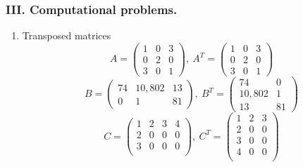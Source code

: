 \documentclass{article}
\begin{document}
\begin{enumerate}
\begin{enumerate}
    \end{enumerate}
\end{enumerate}

\subsubsection*{ III. \textbf{Computational problems.}}
\begin{enumerate}
    \item Transposed matrices
    \begin{displaymath}
        A = \begin{pmatrix}
            1 & 0 & 3 \\
            0 & 2 & 0 \\
            3 & 0 & 1
        \end{pmatrix}, \ 
        A^{T} = \begin{pmatrix}
            1 & 0 & 3 \\
            0 & 2 & 0 \\
            3 & 0 & 1
        \end{pmatrix}
    \end{displaymath}
    \begin{displaymath}
        B = \begin{pmatrix}
            74 & 10,802 & 13 \\
            0 & 1 & 81
        \end{pmatrix}, \ 
        B^{T} = \begin{pmatrix}
            74 & 0 \\
            10,802 & 1 \\
            13 & 81
        \end{pmatrix}
    \end{displaymath}
    \begin{displaymath}
        C = \begin{pmatrix}
            1 & 2 & 3 & 4 \\
            2 & 0 & 0 & 0 \\
            3 & 0 & 0 & 0 \\
        \end{pmatrix}, \ 
        C^{T} = \begin{pmatrix}
            1 & 2 & 3 \\
            2 & 0 & 0 \\
            3 & 0 & 0 \\
            4 & 0 & 0 \\
        \end{pmatrix}

\end{displaymath}
\end{enumerate}
\end{document}
